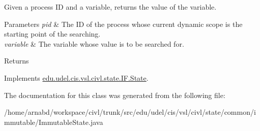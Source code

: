 Given a process I\+D and a variable, returns the value of the variable. 


\begin{DoxyParams}{Parameters}
{\em pid} & The I\+D of the process whose current dynamic scope is the starting point of the searching. \\
\hline
{\em variable} & The variable whose value is to be searched for. \\
\hline
\end{DoxyParams}
\begin{DoxyReturn}{Returns}

\end{DoxyReturn}


Implements \hyperlink{interfaceedu_1_1udel_1_1cis_1_1vsl_1_1civl_1_1state_1_1IF_1_1State_a3c06a06f45da30805c784fd5c1b20985}{edu.\+udel.\+cis.\+vsl.\+civl.\+state.\+I\+F.\+State}.



The documentation for this class was generated from the following file\+:\begin{DoxyCompactItemize}
\item 
/home/arnabd/workspace/civl/trunk/src/edu/udel/cis/vsl/civl/state/common/immutable/Immutable\+State.\+java\end{DoxyCompactItemize}
